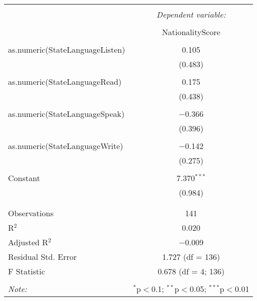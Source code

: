 \documentclass{article}
\begin{document}
\begin{table}[!htbp] \centering 
  \caption{} 
  \label{} 
\begin{tabular}{@{\extracolsep{5pt}}lc} 
\\[-1.8ex]\hline 
\hline \\[-1.8ex] 
 & \multicolumn{1}{c}{\textit{Dependent variable:}} \\ 
\cline{2-2} 
\\[-1.8ex] & NationalityScore \\ 
\hline \\[-1.8ex] 
 as.numeric(StateLanguageListen) & 0.105 \\ 
  & (0.483) \\ 
  & \\ 
 as.numeric(StateLanguageRead) & 0.175 \\ 
  & (0.438) \\ 
  & \\ 
 as.numeric(StateLanguageSpeak) & $-$0.366 \\ 
  & (0.396) \\ 
  & \\ 
 as.numeric(StateLanguageWrite) & $-$0.142 \\ 
  & (0.275) \\ 
  & \\ 
 Constant & 7.370$^{***}$ \\ 
  & (0.984) \\ 
  & \\ 
\hline \\[-1.8ex] 
Observations & 141 \\ 
R$^{2}$ & 0.020 \\ 
Adjusted R$^{2}$ & $-$0.009 \\ 
Residual Std. Error & 1.727 (df = 136) \\ 
F Statistic & 0.678 (df = 4; 136) \\ 
\hline 
\hline \\[-1.8ex] 
\textit{Note:}  & \multicolumn{1}{r}{$^{*}$p$<$0.1; $^{**}$p$<$0.05; $^{***}$p$<$0.01} \\ 
\end{tabular} 
\end{table} 
\end{document}
